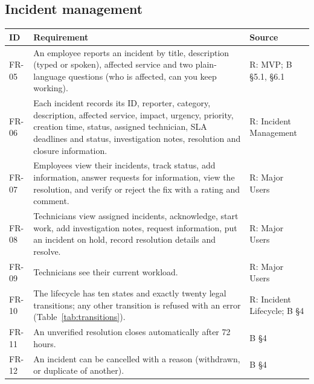 \subsection*{Incident management}
\begin{longtable}{@{}l>{\raggedright\arraybackslash}p{9.6cm}l@{}}
\toprule
\textbf{ID} & \textbf{Requirement} & \textbf{Source} \\
\midrule
\endhead
FR-05 & An employee reports an incident by title, description (typed or spoken), affected
  service and two plain-language questions (who is affected, can you keep working). &
  R: MVP; B §5.1, §6.1 \\
FR-06 & Each incident records its ID, reporter, category, description, affected service,
  impact, urgency, priority, creation time, status, assigned technician, SLA deadlines and
  status, investigation notes, resolution and closure information. & R: Incident Management \\
FR-07 & Employees view their incidents, track status, add information, answer requests for
  information, view the resolution, and verify or reject the fix with a rating and comment. &
  R: Major Users \\
FR-08 & Technicians view assigned incidents, acknowledge, start work, add investigation notes,
  request information, put an incident on hold, record resolution details and resolve. &
  R: Major Users \\
FR-09 & Technicians see their current workload. & R: Major Users \\
FR-10 & The lifecycle has ten states and exactly twenty legal transitions; any other transition
  is refused with an error (Table~\ref{tab:transitions}). & R: Incident Lifecycle; B §4 \\
FR-11 & An unverified resolution closes automatically after 72 hours. & B §4 \\
FR-12 & An incident can be cancelled with a reason (withdrawn, or duplicate of another). & B §4 \\
\bottomrule
\end{longtable}

